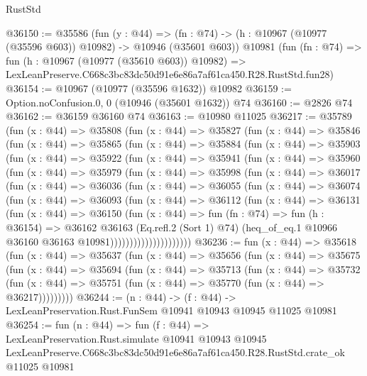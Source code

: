 \begin{lexlean}{RustStd}
\begin{coremodule}
@36150 := @35586
    (fun (y : @44) =>
    (fn : @74) -> (h : @10967 (@10977 (@35596 @603)) @10982) -> @10946 (@35601 @603))
    @10981
    (fun (fn : @74) =>
    fun (h : @10967 (@10977 (@35610 @603)) @10982) =>
    LexLeanPreserve.C668c3bc83dc50d91e6e86a7af61ca450.R28.RustStd.fun28)
@36154 := @10967 (@10977 (@35596 @1632)) @10982
@36159 := Option.noConfusion.{0, 0} (@10946 (@35601 @1632)) @74
@36160 := @2826 @74
@36162 := @36159 @36160 @74
@36163 := @10980 @11025
@36217 := @35789
    (fun (x : @44) =>
    @35808
      (fun (x : @44) =>
      @35827
        (fun (x : @44) =>
        @35846
          (fun (x : @44) =>
          @35865
            (fun (x : @44) =>
            @35884
              (fun (x : @44) =>
              @35903
                (fun (x : @44) =>
                @35922
                  (fun (x : @44) =>
                  @35941
                    (fun (x : @44) =>
                    @35960
                      (fun (x : @44) =>
                      @35979
                        (fun (x : @44) =>
                        @35998
                          (fun (x : @44) =>
                          @36017
                            (fun (x : @44) =>
                            @36036
                              (fun (x : @44) =>
                              @36055
                                (fun (x : @44) =>
                                @36074
                                  (fun (x : @44) =>
                                  @36093
                                    (fun (x : @44) =>
                                    @36112
                                      (fun (x : @44) =>
                                      @36131
                                        (fun (x : @44) =>
                                        @36150
                                          (fun (x : @44) =>
                                          fun (fn : @74) =>
                                          fun (h : @36154) =>
                                          @36162
                                            @36163
                                            (Eq.refl.{2} (Sort 1) @74)
                                            (heq_of_eq.{1}
                                              @10966
                                              @36160
                                              @36163
                                              @10981)))))))))))))))))))))
@36236 := fun (x : @44) =>
  @35618
    (fun (x : @44) =>
    @35637
      (fun (x : @44) =>
      @35656
        (fun (x : @44) =>
        @35675
          (fun (x : @44) =>
          @35694
            (fun (x : @44) =>
            @35713
              (fun (x : @44) =>
              @35732
                (fun (x : @44) => @35751 (fun (x : @44) => @35770 (fun (x : @44) => @36217)))))))))
@36244 := (n : @44) ->
  (f : @44) -> LexLeanPreservation.Rust.FunSem @10941 @10943 @10945 @11025 @10981
@36254 := fun (n : @44) =>
  fun (f : @44) =>
  LexLeanPreservation.Rust.simulate
    @10941
    @10943
    @10945
    LexLeanPreserve.C668c3bc83dc50d91e6e86a7af61ca450.R28.RustStd.crate_ok
    @11025
    @10981
\end{coremodule}
\end{lexlean}
